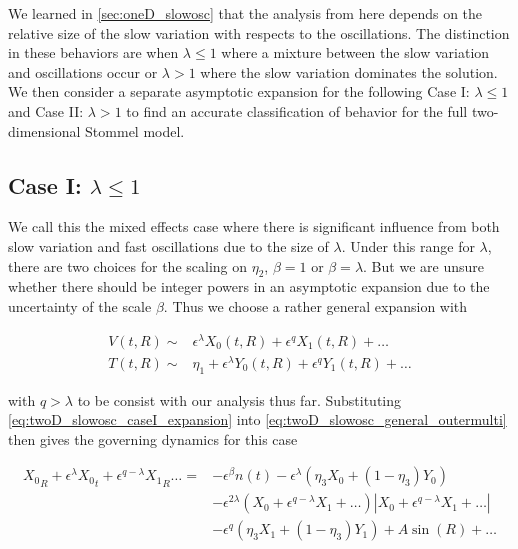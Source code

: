 We learned in \autoref{sec:oneD_slowosc} that the analysis from here depends on the relative size of the slow variation with respects to the oscillations. The distinction in these behaviors are when $\lambda\le1$ where a mixture between the slow variation and oscillations occur or $\lambda>1$ where the slow variation dominates the solution. We then consider a separate asymptotic expansion for the following Case I: $\lambda\le 1$ and Case II: $\lambda >1$ to find an accurate classification of behavior for the full two-dimensional Stommel model.

\subsection{Case I: $\lambda \le 1$}

We call this the mixed effects case where there is significant influence from both slow variation and fast oscillations due to the size of $\lambda$. Under this range for $\lambda$, there are two choices for the scaling on $\eta_2$, $\beta=1$ or $\beta=\lambda$. But we are unsure whether there should be integer powers in an asymptotic expansion due to the uncertainty of the scale $\beta$. Thus we choose a rather general expansion with

\begin{equation}\label{eq:twoD_slowosc_caseI_expansion}
\begin{aligned}
V(t,R)\sim& \epsilon^{\lambda} X_0(t,R)+\epsilon^q X_1(t,R)+\ldots\\
T(t,R)\sim& \eta_1+\epsilon^{\lambda} Y_0(t,R)+\epsilon^q Y_1(t,R)+\ldots
\end{aligned}
\end{equation}

with $q>\lambda$ to be consist with our analysis thus far. Substituting \eqref{eq:twoD_slowosc_caseI_expansion} into \eqref{eq:twoD_slowosc_general_outermulti} then gives the governing dynamics for this case

\begin{equation*}
\begin{aligned}
 {X_0}_R+\epsilon^{\lambda}{X_0}_t+\epsilon^{q-\lambda} {X_1}_R\ldots={} & -\epsilon^{\beta}n(t)-\epsilon^{\lambda} (\eta_3X_0+(1-\eta_3)Y_0) \\
&-\epsilon^{2\lambda}(X_0+\epsilon^{q-\lambda} X_1+\ldots)|X_0+\epsilon^{q-\lambda} X_1+\ldots|\\
& - \epsilon^{q}(\eta_3X_1+(1-\eta_3)Y_1) + A\sin(R) +\ldots
\end{aligned}
\end{equation*}

